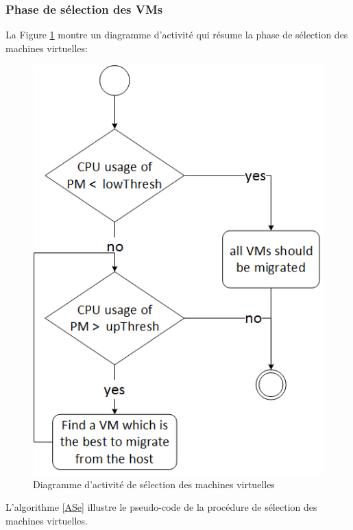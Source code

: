 \begin{onehalfspace}
\subsubsection{Phase de sélection des VMs}

La Figure \ref{DiASe} montre un diagramme d’activité qui résume la phase de sélection des machines virtuelles:
\clearpage
\begin{figure}[!h]
\begin{center}
\includegraphics[scale=0.5]{figures/7.png} 
\end{center}
\caption{Diagramme d'activité de sélection des machines virtuelles}
\label{DiASe}
\end{figure}
L'algorithme \ref{ASe} illustre le pseudo-code de la procédure de sélection des machines virtuelles.
\clearpage
{}

\begin{algorithm}[!h]
\SetAlgoVlined


\end{algorithm}
\end{onehalfspace}
